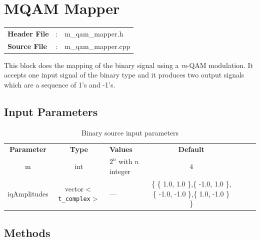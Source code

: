 \clearpage

\section{MQAM Mapper}

\begin{tcolorbox}	
	\begin{tabular}{p{2.75cm} p{0.2cm} p{10.5cm}} 	
		\textbf{Header File}   &:& m\_qam\_mapper.h \\
		\textbf{Source File}   &:& m\_qam\_mapper.cpp \\
	\end{tabular}
\end{tcolorbox}

This block does the mapping of the binary signal using a \textit{m}-QAM modulation. It accepts one input signal of the binary type and it produces two output signals which are a sequence of 1's and -1's.

\subsection*{Input Parameters}

\begin{table}[h]
	\centering
	\begin{tabular}{|c|c|p{60mm}|c|ccp{60mm}}
		\cline{1-4}
		\textbf{Parameter} & \textbf{Type} & \textbf{Values} &   \textbf{Default}& \\ \cline{1-4}
		m & int & $2^n$ with $n$ integer & $4$ \\ \cline{1-4}
		iqAmplitudes & vector$<$\texttt{t\_complex}$>$ & \---- & \{ \{ 1.0, 1.0 \},\{ -1.0, 1.0 \},\{ -1.0, -1.0 \},\{ 1.0, -1.0 \} \} \\ \cline{1-4}
	\end{tabular}
	\caption{Binary source input parameters}
	\label{table:mapper_in_par}
\end{table}

%	

\subsection*{Methods}

